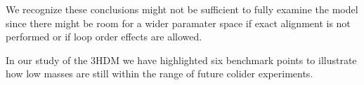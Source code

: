 We recognize these conclusions might not be sufficient to fully examine the model since there might be room for a wider paramater space if exact alignment is not performed or if loop order effects are allowed.

In our study of the 3HDM we have highlighted six benchmark points to illustrate how low masses are still within the range of future colider experiments.



%
% 


%
%
%
%


